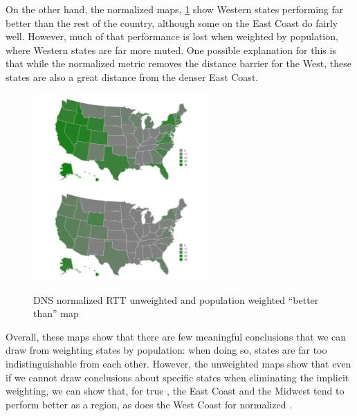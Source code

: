 On the other hand, the normalized maps, \cref{fig:dns_auth_agg_num_better_map_norm_rtt} show Western states performing far better than the rest of the country, although some on the East Coast do fairly well. However, much of that performance is lost when weighted by population, where Western states are far more muted. One possible explanation for this is that while the normalized metric removes the distance barrier for the West, these states are also a great distance from the denser East Coast.

\begin{figure}[htb]
    \centering
    \includegraphics[width=0.6\textwidth]{images/dns/analysis_auth_agg/rtt_normalized/unweighted/num_better_than_map_norm_rtt_un.png}\\
    \includegraphics[width=0.6\textwidth]{images/dns/analysis_auth_agg/rtt_normalized/population/num_better_than_map_norm_rtt_pop.png}
    \caption{DNS normalized RTT unweighted  and population weighted ``better than'' map}
    \label{fig:dns_auth_agg_num_better_map_norm_rtt}
\end{figure}

Overall, these maps show that there are few meaningful conclusions that we can draw from weighting states by population: when doing so, states are far too indistinguishable from each other. However, the unweighted maps show that even if we cannot draw conclusions about specific states when eliminating the implicit \dns weighting, we can show that, for true \rtt, the East Coast and the Midwest tend to perform better as a region, as does the West Coast for normalized \rtt.

\FloatBarrier
